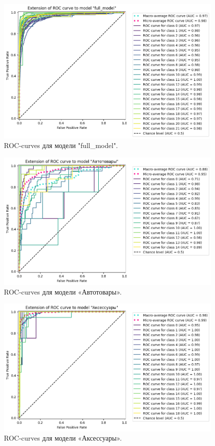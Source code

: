 \documentclass[a4paper,12pt]{extarticle}
\begin{document}
\begin{figure}[hbtp]
	\centering
	\includegraphics[scale=0.7]{roc_curves/roccurve_full_model.png}
	\caption{ROC-curves для модели "full\_model".}
	\label{fig:roccurve_full_model}
\end{figure}

\begin{figure}[hbtp]
	\centering
	\includegraphics[scale=0.7]{roc_curves/roccurve_Автотовары.png}
	\caption{ROC-curves для модели «Автотовары».}
	\label{fig:roccurve_Автотовары}
\end{figure}

\begin{figure}[hbtp]
	\centering
	\includegraphics[scale=0.7]{roc_curves/roccurve_Аксессуары.png}
	\caption{ROC-curves для модели «Аксессуары».}
	\label{fig:roccurve_Аксессуары}
\end{figure}
\end{document}
